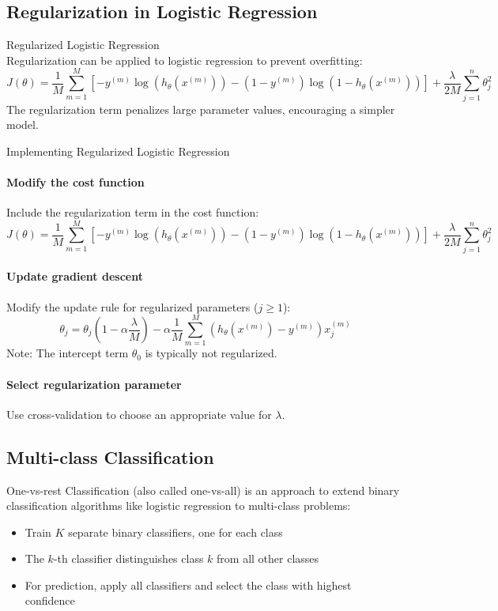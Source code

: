 \subsection{Regularization in Logistic Regression}

\begin{definition}{Regularized Logistic Regression}\\
Regularization can be applied to logistic regression to prevent overfitting:
\[J(\theta) = \frac{1}{M}\sum_{m=1}^{M}[-y^{(m)}\log(h_\theta(x^{(m)})) - (1-y^{(m)})\log(1-h_\theta(x^{(m)}))] + \frac{\lambda}{2M}\sum_{j=1}^{n}\theta_j^2\]
The regularization term penalizes large parameter values, encouraging a simpler model.
\end{definition}

\begin{KR}{Implementing Regularized Logistic Regression}
\paragraph{Modify the cost function}
Include the regularization term in the cost function:
\[J(\theta) = \frac{1}{M}\sum_{m=1}^{M}[-y^{(m)}\log(h_\theta(x^{(m)})) - (1-y^{(m)})\log(1-h_\theta(x^{(m)}))] + \frac{\lambda}{2M}\sum_{j=1}^{n}\theta_j^2\]

\paragraph{Update gradient descent}
Modify the update rule for regularized parameters ($j \geq 1$):
\[\theta_j = \theta_j(1-\alpha\frac{\lambda}{M}) - \alpha\frac{1}{M}\sum_{m=1}^{M}(h_\theta(x^{(m)}) - y^{(m)})x^{(m)}_j\]
Note: The intercept term $\theta_0$ is typically not regularized.

\paragraph{Select regularization parameter}
Use cross-validation to choose an appropriate value for $\lambda$.
\end{KR}

\raggedcolumns
\columnbreak

\subsection{Multi-class Classification}

\begin{definition}{One-vs-rest Classification}
(also called one-vs-all) is an approach to extend binary classification algorithms like logistic regression to multi-class problems:
\begin{itemize}
    \item Train $K$ separate binary classifiers, one for each class
    \item The $k$-th classifier distinguishes class $k$ from all other classes
    \item For prediction, apply all classifiers and select the class with highest confidence
\end{itemize}
\end{definition}

